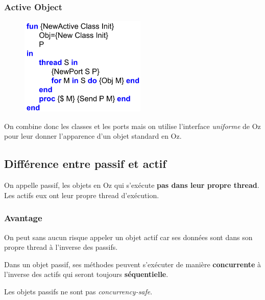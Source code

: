 \documentclass{report}
\begin{document}
\subsubsection{Active Object}
\begin{figure}[H]
\centering
\includegraphics[width=6cm]{img/activeObj.png}
\end{figure}
On combine donc les classes et les ports mais on utilise l'interface \textit{uniforme} de Oz pour leur donner l'apparence d'un objet standard en Oz.

\subsection{Différence entre passif et actif}
On appelle passif, les objets en Oz qui s'exécute \textbf{pas dans leur propre thread}. Les actifs eux ont leur propre thread d'exécution.

\subsubsection{Avantage}
On peut sans aucun risque appeler un objet actif car ses données sont dans son propre thread à l'inverse des passifs. \par 
Dans un objet passif, ses méthodes peuvent s'exécuter de manière \textbf{concurrente} à l'inverse des actifs qui seront toujours \textbf{séquentielle}.\par 
Les objets passifs ne sont pas \textit{concurrency-safe}.
\end{document}
